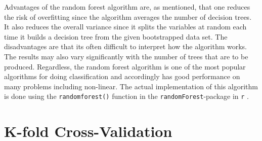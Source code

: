 \documentclass[../thesis.tex]{subfiles}
\begin{document}
\indent Advantages of the random forest algorithm are, as mentioned, that one reduces the risk of overfitting since the algorithm averages the number of decision trees. It also reduces the overall variance since it splits the variables at random each time it builds a decision tree from the given bootstrapped data set. The disadvantages are that its often difficult to interpret how the algorithm works. The results may also vary significantly with the number of trees that are to be produced. Regardless, the random forest algorithm is one of the most popular algorithms for doing classification and accordingly has good performance on many problems including non-linear. The actual implementation of this algorithm is done using the \texttt{randomforest()} function in the \texttt{randomForest}-package in \texttt{r} \citep{randomforest}.    

\section{K-fold Cross-Validation}
\label{sec:validation}
\end{document}
